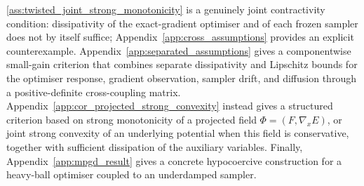 \begin{remark}
\ref{ass:twisted_joint_strong_monotonicity} is a genuinely joint
contractivity condition: dissipativity of the exact-gradient optimiser and
of each frozen sampler does not by itself suffice;
Appendix~\ref{app:cross_assumptions} provides an explicit counterexample.  Appendix~\ref{app:separated_assumptions} gives a componentwise
small-gain criterion that combines separate dissipativity and Lipschitz bounds
for the optimiser response, gradient observation, sampler drift, and diffusion
through a positive-definite cross-coupling matrix.
Appendix~\ref{app:cor_projected_strong_convexity} instead gives a structured
criterion based on strong monotonicity of a projected field
\(\Phi=(F,\nabla_xE)\), or joint strong convexity of an underlying potential
when this field is conservative, together with sufficient dissipation of the
auxiliary variables. Finally, Appendix~\ref{app:mpgd_result} gives a concrete
hypocoercive construction for a heavy-ball optimiser coupled to an
underdamped sampler.
\end{remark}

